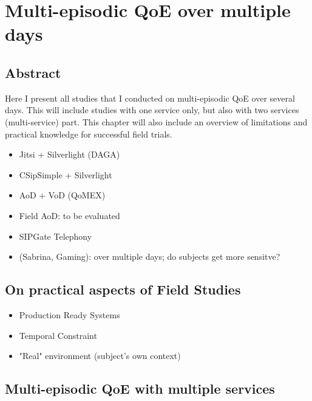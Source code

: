 \chapter{Multi-episodic QoE over multiple days}\label{chap:07}
\section*{Abstract}
Here I present all studies that I conducted on multi-episodic QoE over several days.
This will include studies with one service only, but also with two services (multi-service) part.
This chapter will also include an overview of limitations and practical knowledge for successful field trials.

\begin{itemize}
\item Jitsi + Silverlight (DAGA)
\item CSipSimple + Silverlight
\item AoD + VoD (QoMEX)
\item Field AoD: to be evaluated
\item SIPGate Telephony
\item (Sabrina, Gaming): over multiple days; do subjects get more sensitve?
\end{itemize}

\section{On practical aspects of Field Studies}

\begin{itemize}
\item Production Ready Systems
\item Temporal Constraint
\item "Real" environment (subject's own context)
\end{itemize}

\section{Multi-episodic QoE with multiple services}